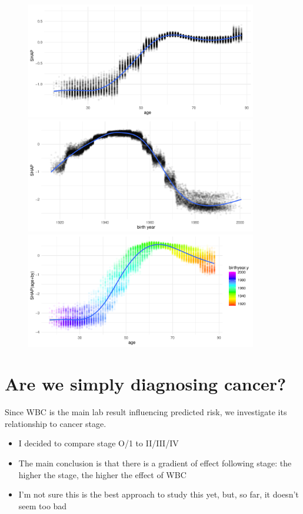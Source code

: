 \documentclass[12pt]{article}
\begin{document}
\begin{figure}[h]
\centering
\includegraphics[width=0.9\textwidth]{figures/birthyear/shap_num_age.pdf}
\includegraphics[width=0.9\textwidth]{figures/birthyear/shap_num_by.pdf}
\includegraphics[width=0.9\textwidth]{figures/birthyear/shap_num_age_by.pdf}
\end{figure}



\clearpage
\section*{Are we simply diagnosing cancer?}

Since WBC is the main lab result influencing predicted risk, we investigate its relationship to cancer stage.
\begin{itemize}
\item I decided to compare stage O/1 to II/III/IV
\item The main conclusion is that there is a gradient of effect following stage: 
the higher the stage, the higher the effect of WBC
\item I'm not sure this is the best approach to study this yet, but, so far, it doesn't seem too bad
\end{itemize}
\end{document}
